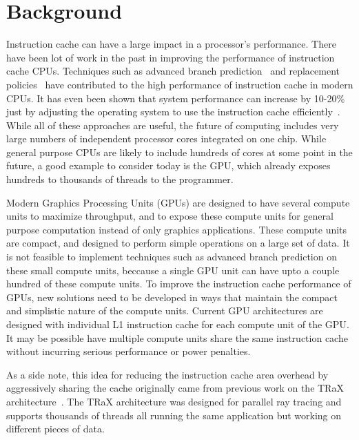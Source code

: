 \section{Background}

Instruction cache can have a large impact in a processor's
performance. 
There have been lot of work in the past in improving the performance
of instruction cache  CPUs. 
Techniques such as advanced branch prediction~\cite{yeh93} and
replacement policies~\cite{smith85} have contributed to the high
performance of instruction cache in modern CPUs. 
It has even been shown that system performance can increase by 10-20\%
just by adjusting the operating system to use the instruction cache
efficiently~\cite{torrellas98}.
While all of these approaches are useful, the future of computing
includes very large numbers of independent processor cores integrated
on one chip.
While general purpose CPUs are likely to include hundreds of cores at
some point in the future, a good example to consider today is the GPU,
which already exposes hundreds to thousands of threads to the
programmer. 

Modern Graphics Processing Units (GPUs) are designed to have several
compute units to maximize throughput, and to expose these compute
units for general purpose computation instead of only graphics
applications.
These compute units are compact, and designed to perform simple
operations on a large set of data. 
It is not feasible to implement techniques such as advanced branch
prediction on these small compute units, beccause a single GPU unit
can have upto a couple hundred of these compute units. 
To improve the instruction cache performance of GPUs, new solutions
need to be developed in ways that maintain the compact and simplistic
nature of the compute units. 
Current GPU architectures are designed with individual L1 instruction
cache for each compute unit of the GPU\cite{keckler11}. 
It may be possible have multiple compute units share the same
instruction cache without incurring serious performance or power
penalties.

As a side note, this idea for reducing the instruction cache area
overhead by aggressively sharing the cache originally came from
previous work on the TRaX architecture~\cite{spjut09,kopta10,spjut12}.
The TRaX architecture was designed for parallel ray tracing and
supports thousands of threads all running the same application but
working on different pieces of data.
